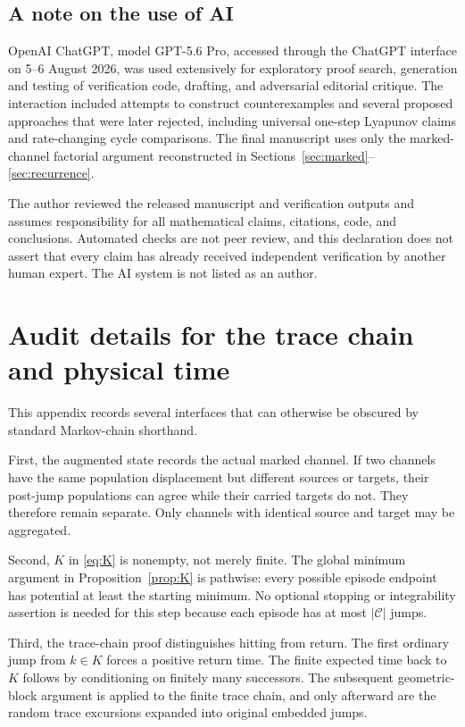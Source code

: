 \subsection*{A note on the use of AI}
OpenAI ChatGPT, model GPT-5.6 Pro, accessed through the ChatGPT interface on
5--6 August 2026, was used extensively for exploratory proof search,
generation and testing of verification code, drafting, and adversarial
editorial critique.  The interaction included attempts to construct
counterexamples and several proposed approaches that were later rejected,
including universal one-step Lyapunov claims and rate-changing cycle
comparisons.  The final manuscript uses only the marked-channel factorial
argument reconstructed in Sections~\ref{sec:marked}--\ref{sec:recurrence}.

The author reviewed the released manuscript and verification outputs and
assumes responsibility for all mathematical claims, citations, code, and
conclusions.  Automated checks are not peer review, and this declaration does
not assert that every claim has already received independent verification by
another human expert.  The AI system is not listed as an author.




\appendix
\section{Audit details for the trace chain and physical time}\label{app:trace}

This appendix records several interfaces that can otherwise be obscured by
standard Markov-chain shorthand.

First, the augmented state records the actual marked channel.  If two
channels have the same population displacement but different sources or
targets, their post-jump populations can agree while their carried targets do
not.  They therefore remain separate.  Only channels with identical source
and target may be aggregated.

Second, \(K\) in \eqref{eq:K} is nonempty, not merely finite.  The global
minimum argument in Proposition~\ref{prop:K} is pathwise: every possible
episode endpoint has potential at least the starting minimum.  No optional
stopping or integrability assertion is needed for this step because each
episode has at most \(|\mathcal C|\) jumps.

Third, the trace-chain proof distinguishes hitting from return.  The first
ordinary jump from \(k\in K\) forces a positive return time.  The finite
expected time back to \(K\) follows by conditioning on finitely many
successors.  The subsequent geometric-block argument is applied to the
finite trace chain, and only afterward are the random trace excursions
expanded into original embedded jumps.

